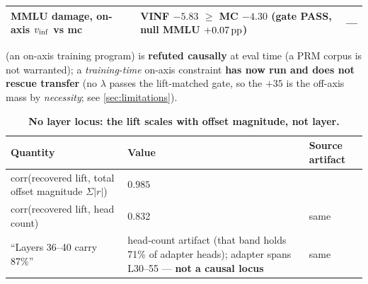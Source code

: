 \begin{table}[tbp]
\begin{threeparttable}
\begin{tabular}{L{5.4cm} L{6.6cm} L{2.8cm}}
MMLU damage, on-axis $v_{\mathrm{inf}}$ vs mc & VINF $-5.83$ ${\geq}$ MC $-4.30$ (gate PASS,
null MMLU $+0.07\,\mathrm{pp}$) & --- \\
\bottomrule
\end{tabular}
\begin{tablenotes}[flushleft]\footnotesize
\item {} (an on-axis training program) is \textbf{refuted
causally} at eval time (a PRM corpus is not warranted); a \emph{training-time}
on-axis constraint \textbf{has now run and does not rescue transfer} (no $\lambda$
passes the lift-matched gate, so the $+35$ is the off-axis mass by
\emph{necessity}; see \cref{sec:limitations}).
\end{tablenotes}
\end{threeparttable}
\end{table}

\begin{table}[tbp]
\centering
\begin{threeparttable}
\caption{\textbf{No layer locus: the lift scales with offset magnitude, not
layer.}}
\label{tab:locus}
\footnotesize
\begin{tabular}{L{5.6cm} L{6.6cm} L{2.6cm}}
\toprule
Quantity & Value & Source artifact \\
\midrule
corr(recovered lift, total offset magnitude $\Sigma|r|$) & $\mathbf{0.985}$ &
  \\
corr(recovered lift, head count) & 0.832 & same \\
``Layers 36--40 carry 87\%'' & head-count artifact (that band holds 71\% of adapter
heads); adapter spans L30--55 --- \textbf{not a causal locus} & same \\
\bottomrule
\end{tabular}
\end{threeparttable}
\end{table}

